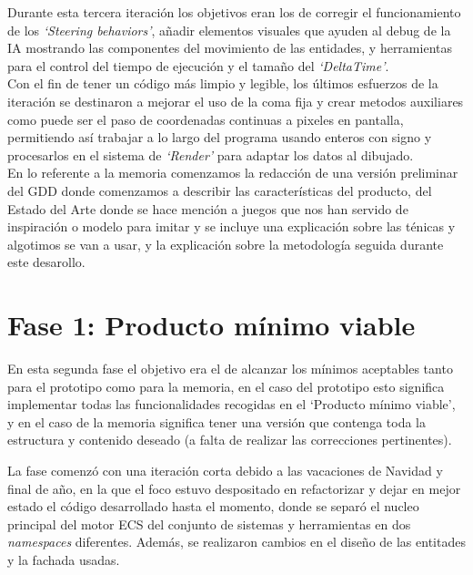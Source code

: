 Durante esta tercera iteración los objetivos eran los de corregir el funcionamiento de los
\textit{`Steering behaviors'}, añadir elementos visuales que ayuden al debug de la \ac{IA}
mostrando las componentes del movimiento de las entidades, y herramientas para el control del
tiempo de ejecución y el tamaño del \textit{`DeltaTime'}.\\
Con el fin de tener un código más limpio y legible, los últimos esfuerzos de la iteración se
destinaron a mejorar el uso de la coma fija y crear metodos auxiliares como puede ser el paso de
coordenadas continuas a pixeles en pantalla, permitiendo así trabajar a lo largo del programa 
usando enteros con signo y procesarlos en el sistema de \textit{`Render'} para adaptar los datos
al dibujado.\\
En lo referente a la memoria comenzamos la redacción de una versión preliminar del \ac{GDD}
donde comenzamos a describir las características del producto, del Estado del Arte donde se hace
mención a juegos que nos han servido de inspiración o modelo para imitar y se incluye una explicación
sobre las ténicas y algotimos se van a usar, y la explicación sobre la metodología seguida durante
este desarollo. 

\section{Fase 1: Producto mínimo viable}
En esta segunda fase el objetivo era el de alcanzar los mínimos aceptables tanto para el prototipo
como para la memoria, en el caso del prototipo esto significa implementar todas las funcionalidades
recogidas en el `Producto mínimo viable', y en el caso de la memoria significa tener una versión
que contenga toda la estructura y contenido deseado (a falta de realizar las correcciones
pertinentes).

La fase comenzó con una iteración corta debido a las vacaciones de Navidad y final de año, en la
que el foco estuvo despositado en refactorizar y dejar en mejor estado el código desarrollado
hasta el momento, donde se separó el nucleo principal del motor \ac{ECS} del conjunto de sistemas y
herramientas en dos \textit{namespaces} diferentes. Además, se realizaron cambios en el diseño
de las entitades y la fachada usadas.

